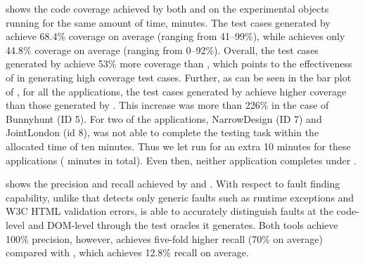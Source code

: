  shows the code coverage achieved by  both \tool and \artemis on the experimental objects running for the same amount of time,  minutes.
The test cases generated by \tool achieve 68.4\% coverage on average (ranging from 41--99\%), while \artemis achieves only 44.8\% coverage on average (ranging from 0--92\%).
Overall, the test cases generated by \tool achieve 53\% more coverage than \artemis, which points to the effectiveness of \tool in generating high coverage test cases. 
Further, as can be seen in the bar plot of , for all the applications, the test cases generated by \tool achieve higher coverage than those generated by \artemis. 
This increase was more than 226\% in the case of Bunnyhunt (ID 5). %
For two of the applications, NarrowDesign (ID 7) and JointLondon (id 8), \artemis was not able to complete the testing task within the allocated time of ten minutes.
Thus we let \artemis run for an extra 10 minutes for these applications ( minutes in total). Even then, neither application completes under \artemis. 

 shows the precision and recall achieved by \tool and \artemis.
With respect to fault finding capability, unlike \artemis that detects only generic faults such as runtime exceptions and W3C HTML validation errors, \tool is able to accurately distinguish faults at the code-level and DOM-level through the test oracles it generates. Both tools achieve 100\% precision, however, \tool achieves five-fold higher recall (70\% on average) compared with \artemis, which achieves 12.8\% recall on average. %
